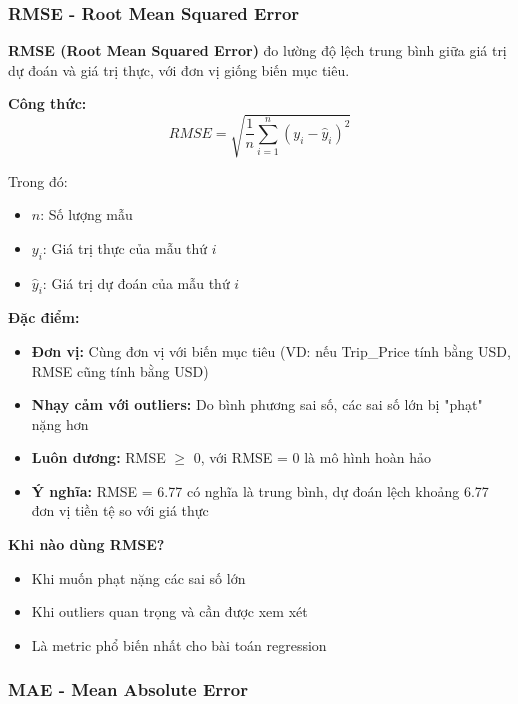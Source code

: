\documentclass[12pt,a4paper]{article}
\begin{document}
\subsubsection{RMSE - Root Mean Squared Error}

\begin{definitionbox}
\textbf{RMSE (Root Mean Squared Error)} đo lường độ lệch trung bình giữa giá trị dự đoán và giá trị thực, với đơn vị giống biến mục tiêu.
\end{definitionbox}

\textbf{Công thức:}
\begin{equation}
RMSE = \sqrt{\frac{1}{n}\sum_{i=1}^{n}(y_i - \hat{y}_i)^2}
\end{equation}

Trong đó:
\begin{itemize}
    \item $n$: Số lượng mẫu
    \item $y_i$: Giá trị thực của mẫu thứ $i$
    \item $\hat{y}_i$: Giá trị dự đoán của mẫu thứ $i$
\end{itemize}

\textbf{Đặc điểm:}
\begin{itemize}
    \item \textbf{Đơn vị:} Cùng đơn vị với biến mục tiêu (VD: nếu Trip\_Price tính bằng USD, RMSE cũng tính bằng USD)
    \item \textbf{Nhạy cảm với outliers:} Do bình phương sai số, các sai số lớn bị "phạt" nặng hơn
    \item \textbf{Luôn dương:} RMSE $\geq$ 0, với RMSE = 0 là mô hình hoàn hảo
    \item \textbf{Ý nghĩa:} RMSE = 6.77 có nghĩa là trung bình, dự đoán lệch khoảng 6.77 đơn vị tiền tệ so với giá thực
\end{itemize}

\textbf{Khi nào dùng RMSE?}
\begin{itemize}
    \item Khi muốn phạt nặng các sai số lớn
    \item Khi outliers quan trọng và cần được xem xét
    \item Là metric phổ biến nhất cho bài toán regression
\end{itemize}

\subsubsection{MAE - Mean Absolute Error}
\end{document}
